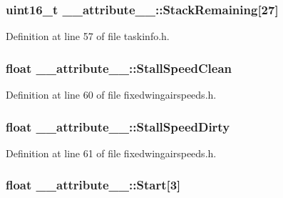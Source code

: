 \hypertarget{struct____attribute_____a9f4beb38be946453a859f150483b39d7}{
\subsubsection[{\-Stack\-Remaining}]{\setlength{\rightskip}{0pt plus 5cm}uint16\-\_\-t {\bf \-\_\-\-\_\-attribute\-\_\-\-\_\-\-::\-Stack\-Remaining}\mbox{[}27\mbox{]}}}\label{struct____attribute_____a9f4beb38be946453a859f150483b39d7}


\-Definition at line 57 of file taskinfo.\-h.

\hypertarget{struct____attribute_____aeb2b2184ca98f75bed476cd35be170f0}{
\subsubsection[{\-Stall\-Speed\-Clean}]{\setlength{\rightskip}{0pt plus 5cm}float {\bf \-\_\-\-\_\-attribute\-\_\-\-\_\-\-::\-Stall\-Speed\-Clean}}}\label{struct____attribute_____aeb2b2184ca98f75bed476cd35be170f0}


\-Definition at line 60 of file fixedwingairspeeds.\-h.

\hypertarget{struct____attribute_____a02fd497626f543f9c15f5f7a439e0b67}{
\subsubsection[{\-Stall\-Speed\-Dirty}]{\setlength{\rightskip}{0pt plus 5cm}float {\bf \-\_\-\-\_\-attribute\-\_\-\-\_\-\-::\-Stall\-Speed\-Dirty}}}\label{struct____attribute_____a02fd497626f543f9c15f5f7a439e0b67}


\-Definition at line 61 of file fixedwingairspeeds.\-h.

\hypertarget{struct____attribute_____a1714b7ec85a536e359f5a0d5190aa134}{
\subsubsection[{\-Start}]{\setlength{\rightskip}{0pt plus 5cm}float {\bf \-\_\-\-\_\-attribute\-\_\-\-\_\-\-::\-Start}\mbox{[}3\mbox{]}}}\label{struct____attribute_____a1714b7ec85a536e359f5a0d5190aa134}


